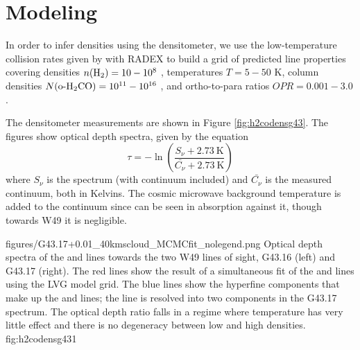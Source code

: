 \section{Modeling \formaldehyde}
In order to infer densities using the \formaldehyde densitometer, we use the
low-temperature collision rates given by \citet{Troscompt2009a} with RADEX
\citep{van-der-Tak2007a} to build a grid of predicted line properties covering
densities $n(\textrm{H}_{2}) = 10-10^8$ \percc, temperatures $T=5-50$ K, column densities
$N(\textrm{o-H}_2\textrm{CO}) = 10^{11}-10^{16}$ \persc, and ortho-to-para ratios 
$OPR = 0.001-3.0$.

The \formaldehyde densitometer measurements are shown in Figure \ref{fig:h2codensg43}.
The figures show optical depth spectra, given by the equation
\begin{equation}
    \tau = -\ln\left(\frac{S_\nu + 2.73\mathrm{~K}}{\bar{C_\nu} + 2.73\mathrm{~K}}\right)
\end{equation}
where $S_\nu$ is the spectrum (with continuum included) and $\bar{C_\nu}$ is
the measured continuum, both in Kelvins.  The cosmic microwave background
temperature is added to the continuum since \formaldehyde can be seen in
absorption against it, though towards W49 it is negligible.

          {figures/G43.17+0.01_40kmscloud_MCMCfit_nolegend.png}
{Optical depth spectra of the \oneone and \twotwo lines towards the two W49
lines of sight, G43.16 (left) and G43.17 (right).  The red lines show the
result of a simultaneous fit of the \ortho \oneone and \twotwo lines using the
LVG model grid.  The blue lines show the hyperfine components that make up the
\oneone and \twotwo lines; the \oneone line is resolved into two components in
the G43.17 spectrum.
The optical depth ratio falls in a regime where temperature has very little
effect and there is no degeneracy between low and high densities.  }
{fig:h2codensg43}{1}

